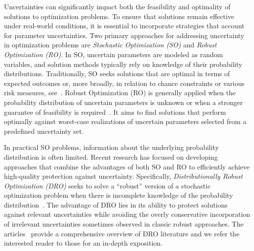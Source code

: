 \documentclass{article}
\begin{document}
Uncertainties can significantly impact both the feasibility and optimality of solutions to optimization problems.
To ensure that solutions remain effective under real-world conditions, it is essential to incorporate strategies that account for parameter uncertainties.
Two primary approaches for addressing uncertainty in optimization problems are \emph{Stochastic Optimization (SO)} and \emph{Robust Optimization (RO)}.
In SO, uncertain parameters are modeled as random variables, and solution methods typically rely on knowledge of their probability distributions.
Traditionally, SO seeks solutions that are optimal in terms of expected outcomes or, more broadly, in relation to chance constraints or various risk measures, see~\cite{BirgeLouveaux1997}.
Robust Optimization (RO) is generally applied when the probability distribution of uncertain parameters is unknown or when a stronger guarantee of feasibility is required~\cite{Ben-TalElGhaouiNemirovski2009, robust_bertsimas_hertog}.
It aims to find solutions that perform optimally against worst-case realizations of uncertain parameters selected from a predefined uncertainty set.

In practical SO problems, information about the underlying probability distribution is often limited.
Recent research has focused on developing approaches that combine the advantages of both SO and RO to efficiently achieve high-quality protection against uncertainty. %
Specifically, \emph{Distributionally Robust Optimization (DRO)} seeks to solve a ``robust'' version of a stochastic optimization problem when there is incomplete knowledge of the probability distribution~\cite{DRO_book}.
The advantage of DRO lies in its ability to protect solutions against relevant uncertainties while avoiding the overly conservative incorporation of irrelevant uncertainties sometimes observed in classic robust approaches.
The articles~\cite{drosurvey1, drosurvey2} provide a comprehensive overview of DRO literature and we refer the interested reader to those for an in-depth exposition.
\end{document}
